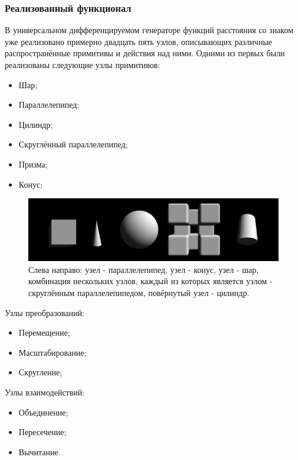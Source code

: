\documentclass[a4paper,hidelinks,12pt]{article}
\begin{document}
\subsubsection{Реализованный функционал}
В универсальном дифференцируемом генераторе функций расстояния со знаком уже реализовано примерно двадцать пять узлов, описывающих различные распространённые примитивы и действия над ними. Одними из первых были реализованы следующие узлы примитивов:
\begin{itemize}
    \item Шар;
    \item Параллелепипед;
    \item Цилиндр;
    \item Скруглённый параллелепипед;
    \item Призма;
    \item Конус;
\end{itemize}

\begin{figure}[H]
\begin{center}
	\includegraphics[width=15 cm]{primitives.png}
	\caption{Слева направо: узел - параллелепипед, узел - конус, узел - шар, комбинация нескольких узлов, каждый из которых является узлом - скруглённым параллелепипедом, повёрнутый узел - цилиндр.}
 	\label{fig_prim}
\end{center}
\end{figure}

Узлы преобразований:
\begin{itemize}
    \item Перемещение;
    \item Масштабирование;
    \item Скругление;
\end{itemize}
Узлы взаимодействий:
\begin{itemize}
    \item Объединение;
    \item Пересечение;
    \item Вычитание.
\end{itemize}
\end{document}
